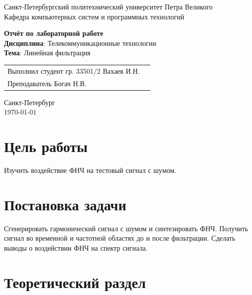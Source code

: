 \documentclass[a4paper,14pt]{extarticle}
\begin{document}
\begin{titlepage}
\centering
Санкт-Петербургский политехнический университет Петра Великого \\
\vspace{0.15cm}
Кафедра компьютерных систем и программных технологий \\
\vspace{6.5cm}

{\centering \textbf{Отчёт по лабораторной работе} \\ 
\vspace{0.15cm}
\textbf{Дисциплина}: Телекоммуникационные технологии \\
\vspace{0.15cm}
\textbf{Тема}: Линейная фильтрация} \\


\vspace{6.5cm}

\begin{table}[H]
\begin{tabular}{p{\textwidth}@{}r}
{Выполнил студент гр. 33501/2} \hfill {Вахаев И.Н.} \\
{Преподаватель} \hfill {Богач Н.В.} \\
\end{tabular}
\end{table}
\vfill

{\centering Санкт-Петербург \\ 
\vspace{0.15cm}
\today}
\end{titlepage}

\tableofcontents
\newpage

\section{Цель работы}

Изучить воздействие ФНЧ на тестовый сигнал с шумом.

\section{Постановка задачи}

Сгенерировать гармонический сигнал с шумом и синтезировать ФНЧ. Получить сигнал во временной и частотной областях до и после фильтрации. Сделать выводы о воздействии ФНЧ на спектр сигнала.

\section{Теоретический раздел}
\end{document}
